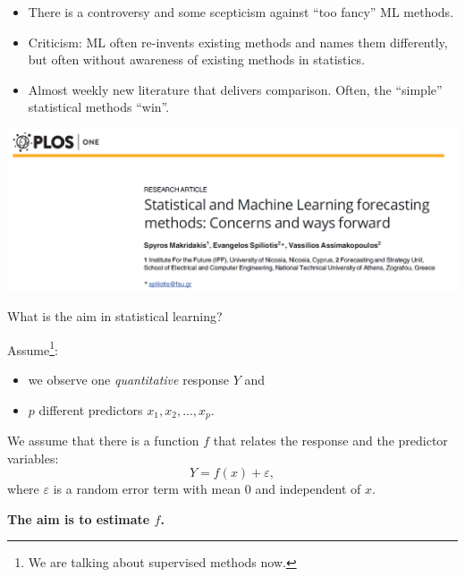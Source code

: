 \documentclass[ignorenonframetext,]{beamer}
\providecommand{\tightlist}{%
  \setlength{\itemsep}{0pt}\setlength{\parskip}{0pt}}
\begin{document}
\begin{frame}

\begin{itemize}
\item
  There is a controversy and some scepticism against ``too fancy'' ML
  methods.
\item
  Criticism: ML often re-invents existing methods and names them
  differently, but often without awareness of existing methods in
  statistics.
\item
  Almost weekly new literature that delivers comparison. Often, the
  ``simple'' statistical methods ``win''.
\end{itemize}

\includegraphics{ML_vs_stat.png}

\end{frame}

\begin{frame}

\begin{block}{What is the aim in statistical learning?}

\vspace{3mm}

Assume\footnote{We are talking about supervised methods now.}:

\begin{itemize}
\tightlist
\item
  we observe one \emph{quantitative} response \(Y\) and
\item
  \(p\) different predictors \(x_1, x_2,... , x_p\).
\end{itemize}

We assume that there is a function \(f\) that relates the response and
the predictor variables: \[ Y = f(x) + \varepsilon,\] where
\(\varepsilon\) is a random error term with mean 0 and independent of
\(x\).

\centering
{\bf The aim is to estimate $f$.}

\end{block}

\end{frame}
\end{document}
